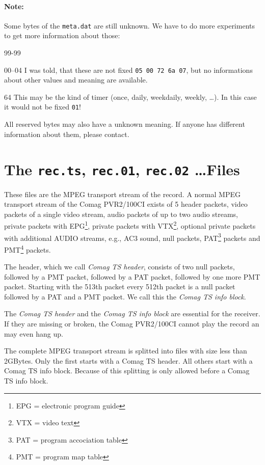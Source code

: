 \documentclass{scrartcl}
\newcommand*{\Comag}{Comag PVR2/100CI\xspace}
\begin{document}
\paragraph{Note:} Some bytes of the \texttt{meta.dat} are still unknown. We
have to do more experiments to get more information about those:
%
%
\begin{labeling}[:]{99-99}
\item[00--04] I was told, that these are not fixed \texttt{05 00 72 6a 07},
  but no informations about other values and meaning are available.
\item[64] This may be the kind of timer (once, daily, weekdaily, weekly,
  \dots). In this case it would not be fixed \texttt{01}!
\end{labeling}
All reserved bytes may also have a unknown meaning. If anyone has different
information about them, please contact.

\section{The \texttt{rec.ts}, \texttt{rec.01}, \texttt{rec.02} \dots Files}
\label{sec:rec.ts-file}

These files are the MPEG transport stream of the record. A normal MPEG
transport stream of the \Comag exists of 5 header packets, video packets of a
single video stream, audio packets of up to two audio streams, private packets
with EPG\footnote{EPG = electronic program guide}, private packets with
VTX\footnote{VTX = video text}, optional private packets with additional AUDIO
streams, e.g., AC3 sound, null packets, PAT\footnote{PAT = program accociation
  table} packets and PMT\footnote{PMT = program map table} packets.

The header, which we call \emph{Comag TS header}, consists of two null
packets, followed by a PMT packet, followed by a PAT packet, followed by one
more PMT packet. Starting with the 513th packet every 512th packet is a null
packet followed by a PAT and a PMT packet. We call this the \emph{Comag TS
  info block}.

The \emph{Comag TS header} and the \emph{Comag TS info block} are essential
for the receiver. If they are missing or broken, the \Comag cannot play the
record an may even hang up.

The complete MPEG transport stream is splitted into files with size less than
2\;GBytes. Only the first starts with a Comag TS header. All others start with
a Comag TS info block. Because of this splitting is only allowed before a
Comag TS info block.
\end{document}

